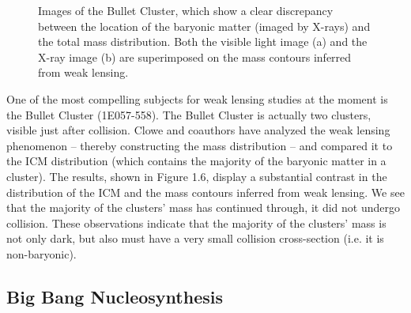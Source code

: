 \documentclass{report}
\begin{document}
\begin{figure}
    \centering
    \caption{Images of the Bullet Cluster, which show a clear discrepancy between the location of the baryonic matter (imaged by X-rays) and the total mass distribution. Both the visible light image (a) and the X-ray image (b) are superimposed on the mass contours inferred from weak lensing.}
\end{figure}

One of the most compelling subjects for weak lensing studies at the moment is the Bullet Cluster (1E057-558). The Bullet Cluster is actually two clusters, visible just after collision. Clowe and coauthors have analyzed the weak lensing phenomenon -- thereby constructing the mass distribution -- and compared it to the ICM distribution (which contains the majority of the baryonic matter in a cluster). The results, shown in Figure 1.6, display a substantial contrast in the distribution of the ICM and the mass contours inferred from weak lensing. We see that the majority of the clusters' mass has continued through, it did not undergo collision. These observations indicate that the majority of the clusters' mass is not only dark, but also must have a very small collision cross-section (i.e. it is non-baryonic).

\subsection{Big Bang Nucleosynthesis}
\end{document}
